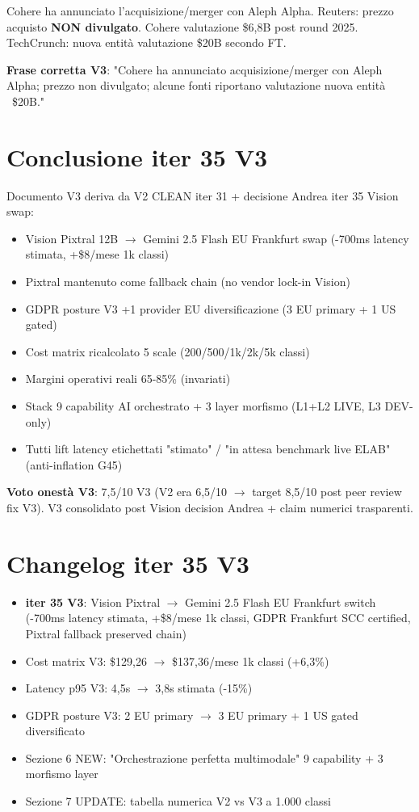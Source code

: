 \documentclass[12pt,a4paper]{article}
\begin{document}
Cohere ha annunciato l'acquisizione/merger con Aleph Alpha. Reuters: prezzo acquisto \textbf{NON divulgato}. Cohere valutazione \$6,8B post round 2025. TechCrunch: nuova entità valutazione \$20B secondo FT.

\textbf{Frase corretta V3}: "Cohere ha annunciato acquisizione/merger con Aleph Alpha; prezzo non divulgato; alcune fonti riportano valutazione nuova entità ~\$20B."

\section{Conclusione iter 35 V3}

Documento V3 deriva da V2 CLEAN iter 31 + decisione Andrea iter 35 Vision swap:
\begin{itemize}[leftmargin=*]
  \item Vision Pixtral 12B \(\rightarrow\) Gemini 2.5 Flash EU Frankfurt swap (-700ms latency stimata, +\$8/mese 1k classi)
  \item Pixtral mantenuto come fallback chain (no vendor lock-in Vision)
  \item GDPR posture V3 +1 provider EU diversificazione (3 EU primary + 1 US gated)
  \item Cost matrix ricalcolato 5 scale (200/500/1k/2k/5k classi)
  \item Margini operativi reali 65-85\% (invariati)
  \item Stack 9 capability AI orchestrato + 3 layer morfismo (L1+L2 LIVE, L3 DEV-only)
  \item Tutti lift latency etichettati "stimato" / "in attesa benchmark live ELAB" (anti-inflation G45)
\end{itemize}

\textbf{Voto onestà V3}: 7,5/10 V3 (V2 era 6,5/10 \(\rightarrow\) target 8,5/10 post peer review fix V3). V3 consolidato post Vision decision Andrea + claim numerici trasparenti.

\section*{Changelog iter 35 V3}

\begin{itemize}[leftmargin=*]
  \item \textbf{iter 35 V3}: Vision Pixtral \(\rightarrow\) Gemini 2.5 Flash EU Frankfurt switch (-700ms latency stimata, +\$8/mese 1k classi, GDPR Frankfurt SCC certified, Pixtral fallback preserved chain)
  \item Cost matrix V3: \$129,26 \(\rightarrow\) \$137,36/mese 1k classi (+6,3\%)
  \item Latency p95 V3: 4,5s \(\rightarrow\) 3,8s stimata (-15\%)
  \item GDPR posture V3: 2 EU primary \(\rightarrow\) 3 EU primary + 1 US gated diversificato
  \item Sezione 6 NEW: "Orchestrazione perfetta multimodale" 9 capability + 3 morfismo layer
  \item Sezione 7 UPDATE: tabella numerica V2 vs V3 a 1.000 classi
\end{itemize}
\end{document}
